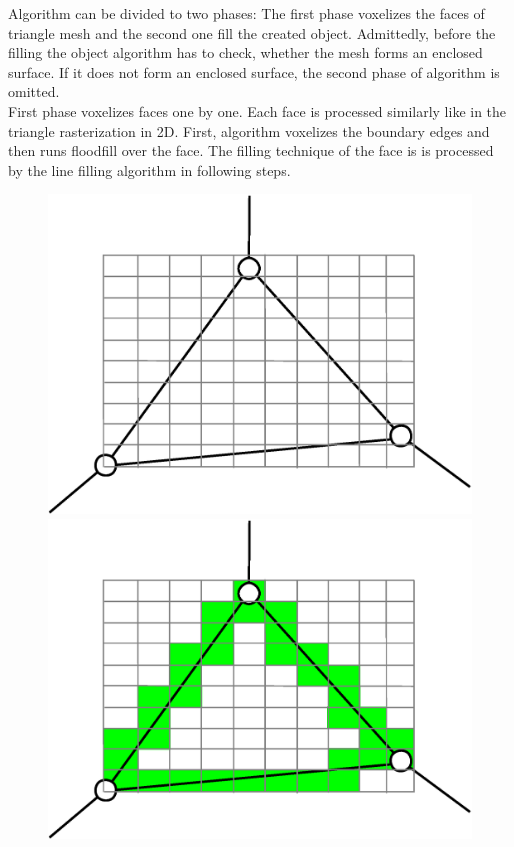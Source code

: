 Algorithm can be divided to two phases: The first phase voxelizes the faces of triangle mesh and the
second one fill the created object. Admittedly, before the filling the object algorithm has to check,
whether the mesh forms an enclosed surface. If it does not form an enclosed surface, the second phase of
algorithm is omitted.\\

First phase voxelizes faces one by one. Each face is processed similarly like in the triangle 
rasterization in 2D.
First, algorithm voxelizes the boundary edges and then runs floodfill over the face. The filling
technique of the face is is processed by the line filling algorithm in following steps. 

\begin{figure}
\centering
\includegraphics[scale=0.25]{../img/voxelize_1.eps}
\includegraphics[scale=0.25]{../img/voxelize_2.eps}\\

\end{figure}

